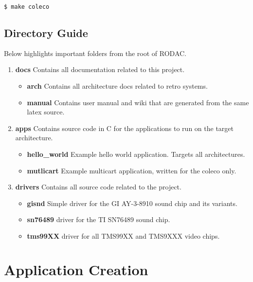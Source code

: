 \documentclass{article}
\begin{document}
  \begin{lstlisting}[language=bash]
    $ make coleco
  \end{lstlisting}

  \subsection{Directory Guide}

  \par
  Below highlights important folders from the root of RODAC.

  \begin{enumerate}
    \item \textbf{docs} Contains all documentation related to this project.
      \begin{itemize}
        \item \textbf{arch} Contains all architecture docs related to retro systems.
        \item \textbf{manual} Contains user manual and wiki that are generated from the same latex source.
      \end{itemize}
    \item \textbf{apps} Contains source code in C for the applications to run on the target architecture.
      \begin{itemize}
        \item \textbf{hello\_world} Example hello world application. Targets all architectures.
        \item \textbf{mutlicart} Example multicart application, written for the coleco only.
      \end{itemize}
    \item \textbf{drivers} Contains all source code related to the project.
      \begin{itemize}
        \item \textbf{gisnd} Simple driver for the GI AY-3-8910 sound chip and its variants.
        \item \textbf{sn76489} driver for the TI SN76489 sound chip.
        \item \textbf{tms99XX} driver for all TMS99XX and TMS9XXX video chips.
      \end{itemize}
  \end{enumerate}

  \newpage

  \section{Application Creation}
\end{document}
